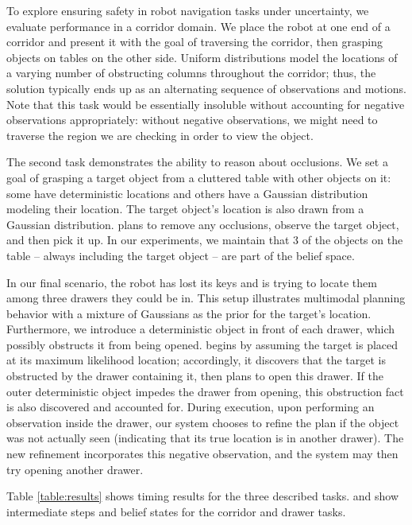 To explore ensuring safety in robot navigation tasks under uncertainty, we
evaluate performance in a corridor domain. We place the robot at one end of a corridor
and present it with the goal of traversing the corridor, then grasping
objects on tables on the other side. Uniform distributions model the locations of
a varying number of obstructing columns throughout the corridor; thus, the solution
typically ends up as an alternating sequence of observations and motions. Note that this task would be essentially
insoluble without accounting for negative observations appropriately: without negative
observations, we might need to traverse the region we are checking in
order to view the object.

The second task demonstrates the ability to reason about occlusions. We
set a goal of grasping a target object from a cluttered table with other
objects on it: some have deterministic locations and others have a Gaussian distribution
modeling their location. The target object's location is also drawn from a Gaussian
distribution. \ibsp{} plans to remove any occlusions, observe the target object, and
then pick it up. In our experiments, we maintain that 3 of the objects on the table -- always including
the target object -- are part of the belief space.

In our final scenario, the robot has lost its keys and is trying to locate them among three drawers they could be in.
This setup illustrates multimodal planning behavior with a mixture of Gaussians as the prior for the target's location.
Furthermore, we introduce a deterministic object in front of each drawer, which possibly
obstructs it from being opened. \ibsp{} begins by assuming the target is placed at its maximum likelihood
location; accordingly, it discovers that the target is obstructed by the drawer containing it, then
plans to open this drawer. If the outer deterministic object impedes the drawer from opening, this
obstruction fact is also discovered and accounted for. During execution, upon performing an observation inside the drawer, our system
chooses to refine the plan if the object was not actually seen (indicating that its true location is in another drawer).
The new refinement incorporates this negative observation, and the system may then try opening another drawer.

Table \ref{table:results} shows timing results for the three described
tasks.  and  show intermediate steps and belief
states for the corridor and drawer tasks.

